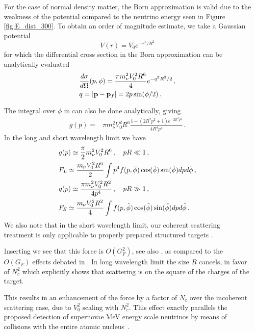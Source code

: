 For the case of normal density matter, the Born approximation is valid due to the weakness of the potential compared to the neutrino energy seen in Figure \ref{fig:E_dist_300}. To obtain an order of magnitude estimate, we take a Gaussian potential \begin{equation}
V(r)=V_0e^{-r^2/R^2}
\end{equation}
for which the differential cross section in the Born approximation can be analytically evaluated
\begin{align}
&\frac{d\sigma}{ d\Omega}(p,\phi)=\frac{\pi m_\nu^2V_0^2R^6}{4}e^{-q^2R^2/2}\,,\notag\\
&q=|{\bf p}-{\bf p}_f|=2p\sin(\phi/2)\,.
\end{align}

The integral over $\phi$ in  can also be done analytically, giving
\begin{align}
g(p)=&\pi m_\nu^2V_0^2R^6\frac{1-(2R^2p^2+1)e^{-2R^2p^2}}{4R^4p^4}\,.
\end{align}
 In the long and short wavelength limit we have 
\begin{align}
\label{long_wave_drag}
&g(p)\simeq\frac{\pi}{2} m_\nu^2V_0^2R^6\,,\quad pR\ll 1\,,\\
&F_L\simeq \frac{m_\nu V_0^2R^6}{2} \int p^4 f(p,\tilde\phi) \cos(\tilde\phi) \sin(\tilde\phi) dpd\tilde\phi\,,\notag\\
\label{short_wave_drag}
&g(p)\simeq\frac{\pi m_\nu^2V_0^2R^2}{4p^4}\,, 
\quad pR\gg 1\,,\\
&F_S\simeq \frac{ m_\nu V_0^2R^2}{4} \int f(p,\tilde\phi) \cos(\tilde\phi) \sin(\tilde\phi) dpd\tilde\phi\notag\,.
\end{align}
 We also note that in the short wavelength limit, our coherent scattering treatment is only applicable to properly prepared structured targets \cite{Liao:2012wb}.

Inserting  we see that this force is $O(G_F^2)$, see also \cite{Shvartsman,Smith:1983jj,Gelmini:2004hg}, as compared to the $O(G_F)$ effects debated in  \cite{Opher:1974drq,Lewis:1979mu,Opher2,Cabibbo:1982bb,Langacker:1982ih,Smith:1983jj,Ferreras:1995wf}. In long wavelength limit the size $R$ cancels, in favor of $N_c^2$ which explicitly shows that scattering is on the square of the charges of the target. 

This results in an enhancement of the force by a factor of $N_c$ over the incoherent scattering case, due to $V_0^2$ scaling with $N_c^2$. This effect exactly parallels the proposed detection of supernovae MeV energy scale neutrinos by means of collisions with the entire atomic nucleus~\cite{Divari:2012zz}.  

